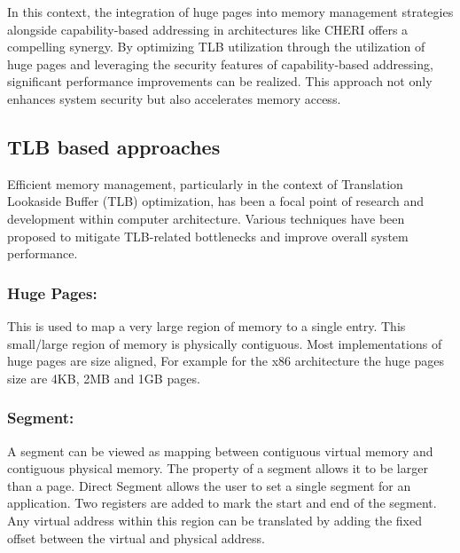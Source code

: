 \documentclass[acmsmall,screen,review]{acmart}
\begin{document}
In this context, the integration of huge pages into memory management 
strategies alongside capability-based addressing in architectures like 
CHERI offers a compelling synergy. By optimizing TLB utilization through the 
utilization of huge pages and leveraging the security features of capability-based addressing, 
significant performance improvements can be realized. This approach not only enhances 
system security but also accelerates memory access.

\subsection{TLB based approaches}
Efficient memory management, particularly in the context of 
Translation Lookaside Buffer (TLB) optimization, has been a focal point of 
research and development within computer architecture. Various techniques have been 
proposed to mitigate TLB-related bottlenecks and improve overall system performance.

\subsubsection{Huge Pages:}
This is used to map a very large region of memory to a 
single entry. This small/large region of memory is physically
contiguous. Most implementations of huge pages \cite{panwar_hawkeye_2019} are size
aligned, For example for the x86 architecture the huge pages 
size are 4KB, 2MB and 1GB pages. 

\subsubsection{Segment:}
A segment can be viewed as mapping between contiguous virtual
memory and contiguous physical memory. The property of a 
segment allows it to be larger than a page. Direct Segment allows the user to set a single segment
for an application. Two registers are added to mark the start
and end of the segment. Any virtual address within this region
can be translated by adding the fixed offset between the virtual
and physical address.
\end{document}
